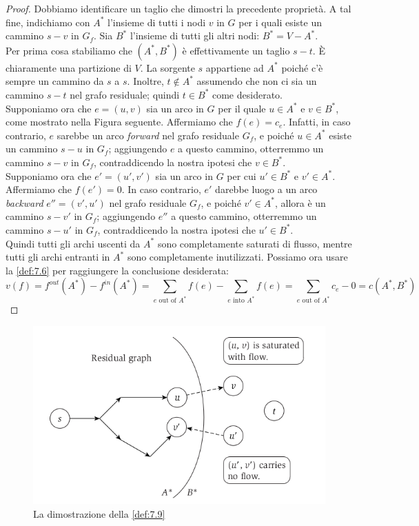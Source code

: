 \begin{proof}
  Dobbiamo identificare un taglio che dimostri la precedente proprietà. A
  tal fine, indichiamo con $A^{*}$ l'insieme di tutti i nodi $v$ in
  $G$ per i quali esiste un cammino $s-v$ in $G_f$. Sia $B^{*}$
  l'insieme di tutti gli altri nodi: $B^{*} = V - A^{*}$.\\

  Per prima cosa stabiliamo che $(A^{*} , B^{*})$ è effettivamente un taglio
  $s-t$. È chiaramente una partizione di $V$. La sorgente $s$
  appartiene ad $A^{*}$ poiché c'è sempre un cammino da $s$ a $s$.
  Inoltre, $t \notin A^{*}$ assumendo che non ci sia un cammino $s-t$
  nel grafo residuale; quindi $t \in B^*$ come desiderato.\\

  Supponiamo ora che $e = (u, v)$ sia un arco in $G$ per il quale
  $u \in A^{*}$ e $v \in B^{*}$, come mostrato nella Figura seguente.
  Affermiamo che $f(e) = c_e$. Infatti, in caso contrario, $e$
  sarebbe un arco \emph{forward} nel grafo residuale $G_f$, e poiché
  $u \in A^{*}$ esiste un cammino $s-u$ in $G_f$; aggiungendo $e$ a
  questo cammino, otterremmo un cammino $s-v$ in $G_f$,
  contraddicendo la nostra ipotesi che $v \in B^{*}$.\\

  Supponiamo ora che $e' = (u' , v')$ sia un arco in $G$ per cui
  $u' \in B^{*}$ e $v' \in A^{*}$. Affermiamo che $f(e') = 0$. In caso
  contrario, $e'$ darebbe luogo a un arco \emph{backward}
  $e'' = (v' , u')$ nel grafo residuale $G_f$, e poiché
  $v' \in A^{*}$, allora è un cammino $s-v'$ in $G_f$; aggiungendo
  $e''$ a questo cammino, otterremmo un cammino $s-u'$ in $G_f$,
  contraddicendo la nostra ipotesi che $u' \in B^{*}$.\\

  Quindi tutti gli archi uscenti da $A^{*}$ sono completamente saturati di
  flusso, mentre tutti gli archi entranti in $A^{*}$ sono completamente
  inutilizzati. Possiamo ora usare la \ref{def:7.6} per raggiungere la conclusione
  desiderata:
  $$
    v(f) = f^{out}(A^{*}) - f^{in}(A^{*}) = \sum_{e \text{ out of }A^{*}} f(e) - \sum_{e \text{ into }A^{*}}f(e) = \sum_{e \text{ out of }A^{*}} c_e - 0 = c(A^{*}, B^{*})
  $$
\end{proof}

\begin{figure}[H]
  \centering
  \includegraphics[width = 10 cm]{capitoli/network_flow/imgs/flow4.png}
  \caption{La dimostrazione della \ref{def:7.9}}
\end{figure}


